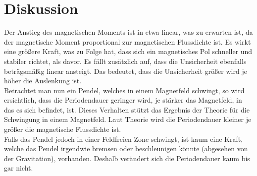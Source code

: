 \section{Diskussion}
\label{sec:Diskussion}

Der Anstieg des magnetischen Moments ist in etwa linear, was zu erwarten ist, da der magnetische Moment proportional zur magnetischen Flussdichte ist. Es wirkt eine größere Kraft, was zu Folge hat, dass sich ein magnetisches Pol schneller und stabiler richtet, als davor.
Es fällt zusätzlich auf, dass die Unsicherheit ebenfalls beträgsmäßig linear ansteigt. Das bedeutet, dass die Unsicherheit größer wird je höher die Auslenkung ist.\\
Betrachtet man nun ein Pendel, welches in einem Magnetfeld schwingt, so wird ersichtlich, dass die Periodendauer geringer wird, je stärker das Magnetfeld, in das es sich befindet, ist. Dieses Verhalten stützt das Ergebnis der Theorie für die Schwingung in einem Magnetfeld. Laut Theorie wird die Periodendauer kleiner je größer die magnetische Flussdichte ist.\\
Falls das Pendel jedoch in einer Feldfreien Zone schwingt, ist kaum eine Kraft, welche das Pendel irgendwie bremsen oder beschleunigen könnte (abgesehen von der Gravitation), vorhanden. Deshalb verändert sich die Periodendauer kaum bis gar nicht.

